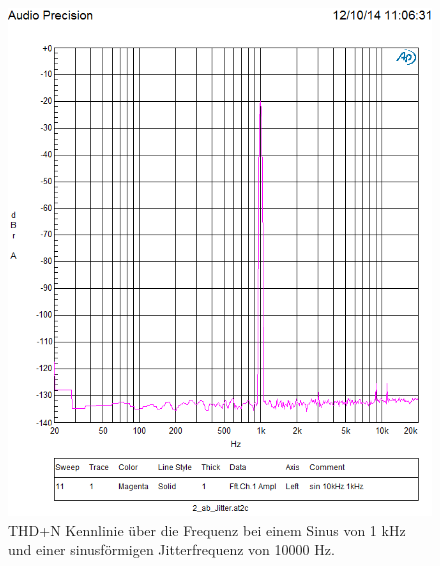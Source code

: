 \begin{figure}[h!]
\centering
\includegraphics[width=\columnwidth]{figures/Aufg2/11.PNG} 
\caption{THD+N Kennlinie über die Frequenz bei einem Sinus von 1 kHz und einer sinusförmigen Jitterfrequenz von 10000 Hz.}
\label{fig:4}
\end{figure}


